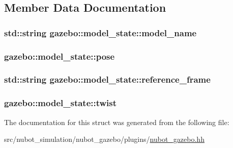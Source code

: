 \subsection{Member Data Documentation}
\hypertarget{structgazebo_1_1model__state_a796837a0feaa387282fac7735cf6cf56}{
\subsubsection[{model\-\_\-name}]{\setlength{\rightskip}{0pt plus 5cm}std\-::string gazebo\-::model\-\_\-state\-::model\-\_\-name}}\label{structgazebo_1_1model__state_a796837a0feaa387282fac7735cf6cf56}
\hypertarget{structgazebo_1_1model__state_a59c702ff3b33ef414d90cdcb873bad94}{
\subsubsection[{pose}]{ gazebo\-::model\-\_\-state\-::pose}}\label{structgazebo_1_1model__state_a59c702ff3b33ef414d90cdcb873bad94}
\hypertarget{structgazebo_1_1model__state_a22787f252a57adeadc5983b5127c1027}{
\subsubsection[{reference\-\_\-frame}]{\setlength{\rightskip}{0pt plus 5cm}std\-::string gazebo\-::model\-\_\-state\-::reference\-\_\-frame}}\label{structgazebo_1_1model__state_a22787f252a57adeadc5983b5127c1027}
\hypertarget{structgazebo_1_1model__state_a60485b3f1187365afb7fb0105063b4ec}{
\subsubsection[{twist}]{ gazebo\-::model\-\_\-state\-::twist}}\label{structgazebo_1_1model__state_a60485b3f1187365afb7fb0105063b4ec}


The documentation for this struct was generated from the following file\-:\begin{DoxyCompactItemize}
\item 
src/nubot\-\_\-simulation/nubot\-\_\-gazebo/plugins/\hyperlink{nubot__gazebo_8hh}{nubot\-\_\-gazebo.\-hh}\end{DoxyCompactItemize}
